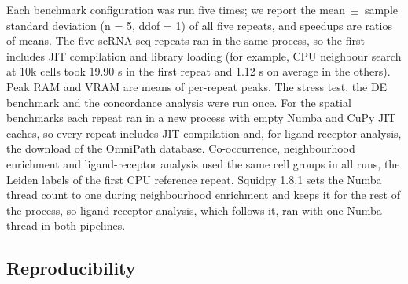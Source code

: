 \documentclass[runningheads]{llncs}
\begin{document}
Each benchmark configuration was run five times; we report the mean~$\pm$~sample standard deviation (n = 5, ddof = 1) of all five repeats, and speedups are ratios of means. The five scRNA-seq repeats ran in the same process, so the first includes JIT compilation and library loading (for example, CPU neighbour search at 10k cells took 19.90 s in the first repeat and 1.12 s on average in the others). Peak RAM and VRAM are means of per-repeat peaks. The stress test, the DE benchmark and the concordance analysis were run once.
For the spatial benchmarks each repeat ran in a new process with empty Numba and CuPy JIT caches, so every repeat includes JIT compilation and, for ligand-receptor analysis, the download of the OmniPath database. Co-occurrence, neighbourhood enrichment and ligand-receptor analysis used the same cell groups in all runs, the Leiden labels of the first CPU reference repeat. Squidpy 1.8.1 sets the Numba thread count to one during neighbourhood enrichment and keeps it for the rest of the process, so ligand-receptor analysis, which follows it, ran with one Numba thread in both pipelines.

\hypertarget{reproducibility}{%
\subsection{Reproducibility}\label{reproducibility}}
\end{document}
